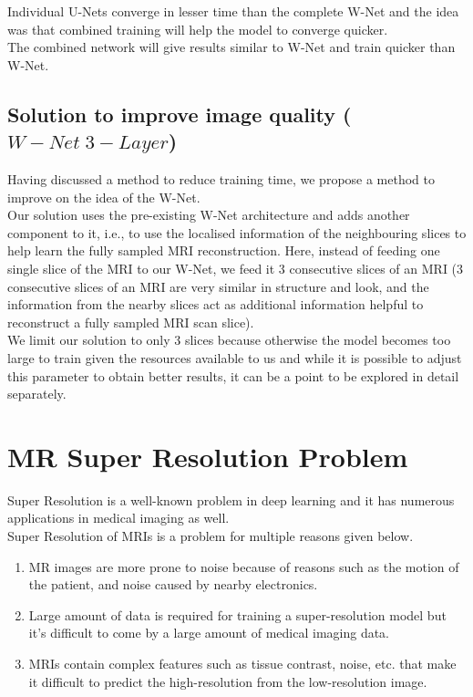 Individual U-Nets converge in lesser time than the complete W-Net and the idea was that combined training will help the model to converge quicker.\\

The combined network will give results similar to W-Net and train quicker than W-Net.\\

\subsection{Solution to improve image quality ($W-Net\;3-Layer$)}

Having discussed a method to reduce training time, we propose a method to improve on the idea of the W-Net.\\

Our solution uses the pre-existing W-Net architecture \cite{8919674} and adds another component to it, i.e., to use the localised information of the neighbouring slices to help learn the fully sampled MRI reconstruction. Here, instead of feeding one single slice of the MRI to our W-Net, we feed it 3 consecutive slices of an MRI (3 consecutive slices of an MRI are very similar in structure and look, and the information from the nearby slices act as additional information helpful to reconstruct a fully sampled MRI scan slice).\\

We limit our solution to only 3 slices because otherwise the model becomes too large to train given the resources available to us and while it is possible to adjust this parameter to obtain better results, it can be a point to be explored in detail separately.\\

\section{MR Super Resolution Problem}\label{sec:prob_2}

Super Resolution is a well-known problem in deep learning and it has numerous applications in medical imaging as well.\\

Super Resolution of MRIs is a problem for multiple reasons given below.

\begin{enumerate}
\item MR images are more prone to noise because of reasons such as the motion of the patient, and noise caused by nearby electronics.

\item Large amount of data is required for training a super-resolution model but it's difficult to come by a large amount of medical imaging data.

\item MRIs contain complex features such as tissue contrast, noise, etc. that make it difficult to predict the high-resolution from the low-resolution image.
\end{enumerate}

